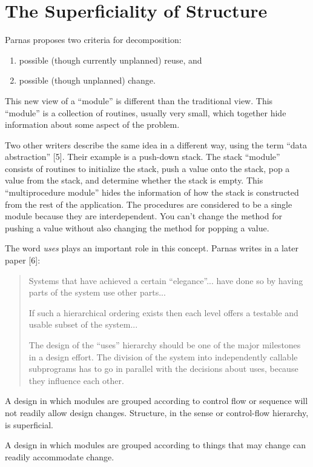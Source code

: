 \section{The Superficiality of Structure}

Parnas proposes two criteria for decomposition:

\begin{enumerate}
\item possible (though currently unplanned) reuse, and
\item possible (though unplanned) change.
\end{enumerate}
This new view of a {}``module'' is different than the traditional
view. This {}``module'' is a collection of routines, usually very
small, which together hide information about some aspect of the problem. 

Two other writers describe the same idea in a different way, using
the term {}``data abstraction'' {[}5{]}. Their example is a push-down
stack. The stack {}``module'' consists of routines to initialize
the stack, push a value onto the stack, pop a value from the stack,
and determine whether the stack is empty. This {}``multiprocedure
module'' hides the information of how the stack is constructed from
the rest of the application. The procedures are considered to be a
single module because they are interdependent. You can't change the
method for pushing a value without also changing the method for popping
a value.

The word \emph{uses} plays an important role in this concept. Parnas
writes in a later paper {[}6{]}:

\begin{quote}
Systems that have achieved a certain {}``elegance''... have done
so by having parts of the system use other parts...

If such a hierarchical ordering exists then each level offers a testable
and usable subset of the system...

The design of the {}``uses'' hierarchy should be one of the major
milestones in a design effort. The division of the system into independently
callable subprograms has to go in parallel with the decisions about
uses, because they influence each other.
\end{quote}
A design in which modules are grouped according to control flow or
sequence will not readily allow design changes. Structure, in the
sense or control-flow hierarchy, is superficial.

A design in which modules are grouped according to things that may
change can readily accommodate change.


